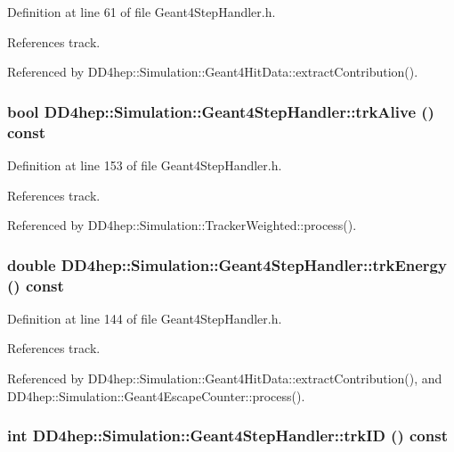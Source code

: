 Definition at line 61 of file Geant4StepHandler.h.

References track.

Referenced by DD4hep::Simulation::Geant4HitData::extractContribution().\hypertarget{class_d_d4hep_1_1_simulation_1_1_geant4_step_handler_a8960f975f297caa7c6d227e329ec4f95}{
\subsubsection[{trkAlive}]{\setlength{\rightskip}{0pt plus 5cm}bool DD4hep::Simulation::Geant4StepHandler::trkAlive () const}}
\label{class_d_d4hep_1_1_simulation_1_1_geant4_step_handler_a8960f975f297caa7c6d227e329ec4f95}


Definition at line 153 of file Geant4StepHandler.h.

References track.

Referenced by DD4hep::Simulation::TrackerWeighted::process().\hypertarget{class_d_d4hep_1_1_simulation_1_1_geant4_step_handler_a959289c814f1eb86b0ab9968f6fd84c5}{
\subsubsection[{trkEnergy}]{\setlength{\rightskip}{0pt plus 5cm}double DD4hep::Simulation::Geant4StepHandler::trkEnergy () const}}
\label{class_d_d4hep_1_1_simulation_1_1_geant4_step_handler_a959289c814f1eb86b0ab9968f6fd84c5}


Definition at line 144 of file Geant4StepHandler.h.

References track.

Referenced by DD4hep::Simulation::Geant4HitData::extractContribution(), and DD4hep::Simulation::Geant4EscapeCounter::process().\hypertarget{class_d_d4hep_1_1_simulation_1_1_geant4_step_handler_a6b639a13014e835db1a7b4a1e69469d1}{
\subsubsection[{trkID}]{\setlength{\rightskip}{0pt plus 5cm}int DD4hep::Simulation::Geant4StepHandler::trkID () const}}
\label{class_d_d4hep_1_1_simulation_1_1_geant4_step_handler_a6b639a13014e835db1a7b4a1e69469d1}


